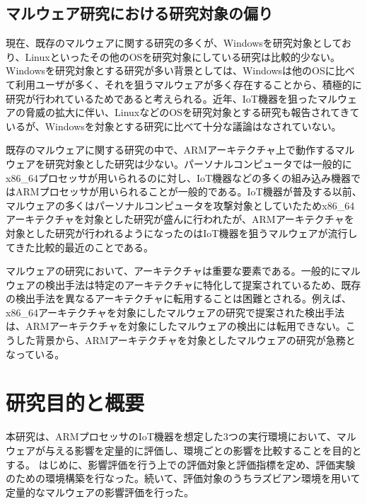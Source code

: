 \documentclass[12pt,a4paper,titlepage,report]{jsbook}
\begin{document}

\subsection{マルウェア研究における研究対象の偏り}
現在、既存のマルウェアに関する研究の多くが、Windowsを研究対象としており、Linuxといったその他のOSを研究対象にしている研究は比較的少ない\cite{malwaresurvey}。Windowsを研究対象とする研究が多い背景としては、Windowsは他のOSに比べて利用ユーザが多く、それを狙うマルウェアが多く存在することから、積極的に研究が行われているためであると考えられる。近年、IoT機器を狙ったマルウェアの脅威の拡大に伴い、LinuxなどのOSを研究対象とする研究も報告されてきているが、Windowsを対象とする研究に比べて十分な議論はなされていない。

既存のマルウェアに関する研究の中で、ARMアーキテクチャ上で動作するマルウェアを研究対象とした研究は少ない。パーソナルコンピュータでは一般的にx86\_64プロセッサが用いられるのに対し、IoT機器などの多くの組み込み機器ではARMプロセッサが用いられることが一般的である\cite{malwaresurvey}。IoT機器が普及する以前、マルウェアの多くはパーソナルコンピュータを攻撃対象としていたためx86\_64アーキテクチャを対象とした研究が盛んに行われたが、ARMアーキテクチャを対象とした研究が行われるようになったのはIoT機器を狙うマルウェアが流行してきた比較的最近のことである\cite{malwaresurvey}。

マルウェアの研究において、アーキテクチャは重要な要素である。一般的にマルウェアの検出手法は特定のアーキテクチャに特化して提案されているため、既存の検出手法を異なるアーキテクチャに転用することは困難とされる。例えば、x86\_64アーキテクチャを対象にしたマルウェアの研究で提案された検出手法は、ARMアーキテクチャを対象にしたマルウェアの検出には転用できない。こうした背景から、ARMアーキテクチャを対象としたマルウェアの研究が急務となっている。

\section{研究目的と概要}
本研究は、ARMプロセッサのIoT機器を想定した3つの実行環境において、マルウェアが与える影響を定量的に評価し、環境ごとの影響を比較することを目的とする。
はじめに、影響評価を行う上での評価対象と評価指標を定め、評価実験のための環境構築を行なった。続いて、評価対象のうちラズビアン環境を用いて定量的なマルウェアの影響評価を行った。

\end{document}
